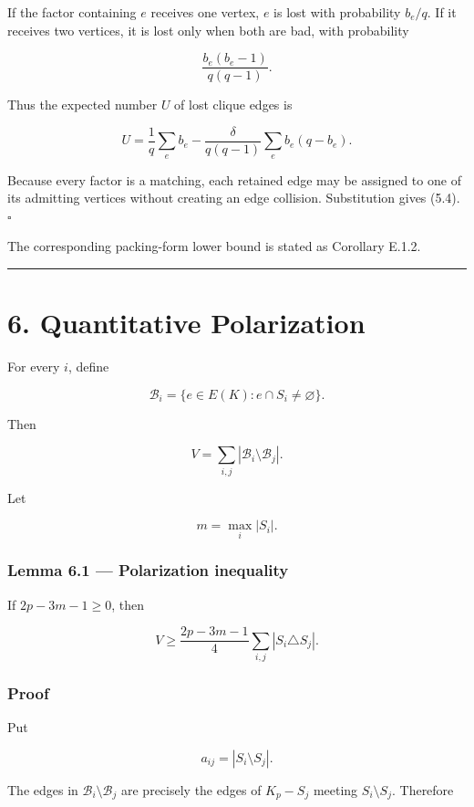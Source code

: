 \documentclass[english,11pt,a4paper]{article}
\begin{document}
If the factor containing \(e\) receives one vertex, \(e\) is lost with
probability \(b_e/q\). If it receives two vertices, it is lost only when
both are bad, with probability

\[
\frac{b_e(b_e-1)}{q(q-1)}.
\]

Thus the expected number \(U\) of lost clique edges is

\[
U
=
\frac1q\sum_e b_e
-
\frac{\delta}{q(q-1)}\sum_e b_e(q-b_e).
\]

Because every factor is a matching, each retained edge may be assigned
to one of its admitting vertices without creating an edge collision.
Substitution gives (5.4). \(\square\)

The corresponding packing-form lower bound is stated as Corollary E.1.2.

\begin{center}\rule{0.5\linewidth}{0.5pt}\end{center}

\section{6. Quantitative Polarization}\label{quantitative-polarization}

For every \(i\), define

\[
\mathcal B_i=\{e\in E(K):e\cap S_i\ne\varnothing\}.
\]

Then

\[
V=\sum_{i,j}|\mathcal B_i\setminus\mathcal B_j|.
\tag{6.1}
\]

Let

\[
m=\max_i|S_i|.
\]

\subsubsection{Lemma 6.1 --- Polarization
inequality}\label{lemma-6.1-polarization-inequality}

If \(2p-3m-1\ge0\), then

\[
\boxed{
V
\ge
\frac{2p-3m-1}{4}
\sum_{i,j}|S_i\triangle S_j|
}.
\tag{6.2}
\]

\subsubsection{Proof}\label{proof-5}

Put

\[
a_{ij}=|S_i\setminus S_j|.
\]

The edges in \(\mathcal B_i\setminus\mathcal B_j\) are precisely the
edges of \(K_p-S_j\) meeting \(S_i\setminus S_j\). Therefore
\end{document}
